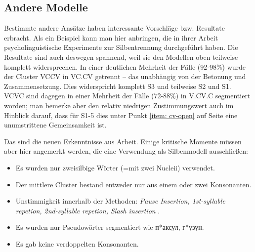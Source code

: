 \documentclass[12pt,headsepline,a4paper]{scrartcl}
\newcommand\textcyr[1]{{\fontencoding{OT2}\fontfamily{wncyr}\selectfont #1}}
\begin{document}
\subsection{Andere Modelle}
Bestimmte andere Ansätze haben interessante Vorschläge bzw. Resultate erbracht. Als ein Beispiel kann man hier \textcite{cote2011} anbringen, die in ihrer Arbeit psycholinguistische Experimente zur Silbentrennung durchgeführt haben. Die Resultate sind auch deswegen spannend, weil sie den Modellen oben teilweise komplett widersprechen. In einer deutlichen Mehrheit der Fälle (92-98\%) wurde der Cluster VCCV in VC.CV getrennt -- das unabhängig von der Betonung und Zusammensetzung. Dies widerspricht komplett S3 und teilweise S2 und S1. VCVC sind dagegen in einer Mehrheit der Fälle (72-88\%) in V.CV.C segmentiert worden; man bemerke aber den relativ niedrigen Zustimmungswert auch im Hinblick darauf, dass für S1-5 dies unter Punkt \ref{item: cv-open} auf Seite \pageref{sec:sylmodels} eine unumstrittene Gemeinsamkeit ist.

Das sind die neuen Erkenntnisse aus Arbeit.  Einige kritische Momente müssen aber hier angemerkt werden, die eine Verwendung als Silbenmodell ausschließen:
\begin{itemize}
  \item Es wurden nur zweisilbige Wörter (=mit zwei Nucleii) verwendet.
  \item Der mittlere Cluster bestand entweder nur aus einem oder zwei Konsonanten.
  \item Unstimmigkeit innerhalb der Methoden: \textit{Pause Insertion, 1st-syllable repetion, 2nd-syllable repetion, Slash insertion} \autocite[281--282]{cote2011}.
  \item Es wurden nur Pseudowörter segmentiert wie \textcyr{п*{а}ксул, г*{у}зун}.
  \item Es gab keine verdoppelten Konsonanten.
\end{itemize}
\end{document}
